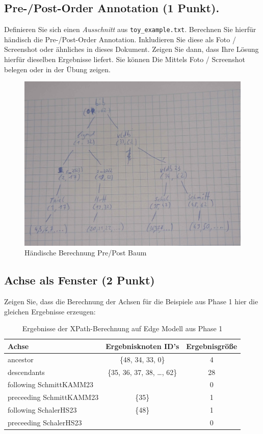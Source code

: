 \documentclass[11pt]{scrartcl}
\begin{document}
\subsection*{Pre-/Post-Order Annotation (1 Punkt).}
Definieren Sie sich einen \textit{Ausschnitt} aus \texttt{toy\_example.txt}.
Berechnen Sie hierfür händisch die Pre-/Post-Order Annotation.
Inkludieren Sie diese als Foto / Screenshot oder ähnliches in dieses Dokument.
Zeigen Sie dann, dass Ihre Lösung hierfür dieselben Ergebnisse liefert.
Sie können Die Mittels Foto / Screenshot belegen oder in der Übung zeigen.

\begin{figure}[H]
	\includegraphics[width=\linewidth]{PrePostBaum.png}
	\caption{Händische Berechnung Pre/Post Baum}\label{fig:node}
\end{figure}

\newpage

\subsection*{Achse als Fenster (2 Punkt)}
Zeigen Sie, dass die Berechnung der Achsen für die Beispiele aus Phase 1 hier die gleichen Ergebnisse erzeugen:

\begin{table}[h]
	\centering
		\begin{center}
			\begin{tabular}{ l | c c }
				\toprule
				Achse & Ergebnisknoten ID's & Ergebnisgröße\\
				\midrule
				ancestor & \{48, 34, 33, 0\} & 4 \\
				descendants & \{35, 36, 37, 38, \ldots, 62\} & 28 \\
				following SchmittKAMM23 & \emptyset & 0 \\
				preceeding SchmittKAMM23 & \{35\} & 1 \\
				following SchalerHS23 & \{48\} & 1 \\
				preceeding SchalerHS23 & \emptyset & 0 \\
				\bottomrule
			\end{tabular}
			\end{center}
	\caption{Ergebnisse der XPath-Berechnung auf Edge Modell aus Phase 1}
	\label{tab:ErgebnisseDerXPathBerechnug}
\end{table}
\end{document}
